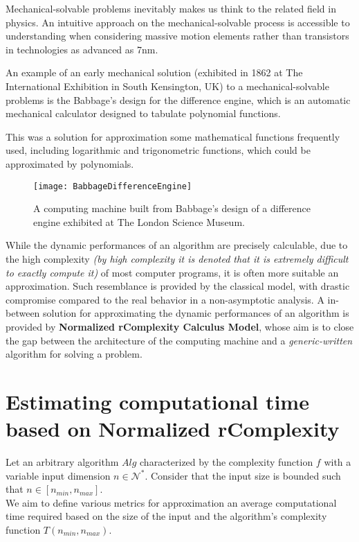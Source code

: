 \begin{remark}
    Mechanical-solvable problems inevitably makes us think to the related field in physics. An intuitive approach on the mechanical-solvable process is accessible
    to understanding when considering massive motion elements rather than transistors in technologies as advanced as 7nm.

    An example of an early mechanical solution (exhibited in 1862 at The International Exhibition in South Kensington, UK) to a mechanical-solvable problems is the Babbage's design for the difference engine, which is an automatic mechanical calculator designed to tabulate polynomial functions.

    This was a solution for approximation some mathematical functions frequently used, including logarithmic and trigonometric functions, which could be approximated by polynomials.

    \begin{figure}[H]
        \centering
        \texttt{[image: BabbageDifferenceEngine]}
        \caption{A computing machine built from Babbage's design of a difference engine exhibited at The London Science Museum.}
    \end{figure}

\end{remark}

While the dynamic performances of an algorithm are precisely calculable, due to the high complexity \textit{(by high complexity it is denoted that it is extremely difficult to exactly compute it)} of most computer programs, it is often more suitable an approximation. Such resemblance is provided by the classical model, with drastic compromise compared to the real behavior in a non-asymptotic analysis. A in-between solution for approximating the dynamic performances of an algorithm is provided by \textbf{Normalized rComplexity Calculus Model}, whose aim is to close the gap between the architecture of the computing machine and a \textit{generic-written} algorithm for solving a problem.


\section{Estimating computational time based on Normalized rComplexity}
Let an arbitrary algorithm $Alg$ characterized by the complexity function $f$ with a variable input dimension $n \in \mathcal{N}^{*}$. Consider that the input size is bounded such that $n \in [n_{min}, n_{max}]$. \\
We aim to define various metrics for approximation an average computational time required based on the size of the input and the algorithm's complexity function  $T(n_{min}, n_{max})$.\\

